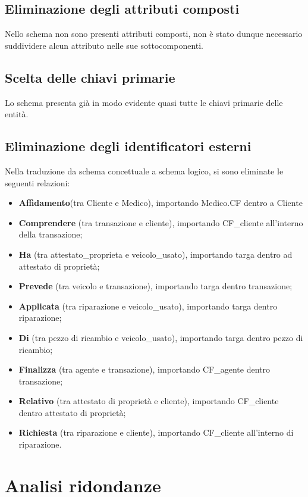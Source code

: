 \documentclass[a4paper,12pt]{report}
\begin{document}
\subsection*{Eliminazione degli attributi composti }
Nello schema non sono presenti attributi composti, non è stato dunque necessario suddividere alcun attributo nelle sue sottocomponenti.
\subsection*{Scelta delle chiavi primarie }
Lo schema presenta già in modo evidente quasi tutte le chiavi primarie delle entità.

\subsection*{Eliminazione degli identificatori esterni }
Nella traduzione da schema concettuale a schema logico, si sono eliminate le seguenti relazioni: 

\begin{itemize}
	\item \textbf{Affidamento}(tra Cliente e Medico), importando Medico.CF dentro a Cliente 
	\item \textbf{Comprendere} (tra transazione e cliente), importando CF\_cliente all’interno della transazione;
	\item \textbf{Ha} (tra attestato\_proprieta e veicolo\_usato), importando targa dentro ad attestato di proprietà;
	\item \textbf{Prevede} (tra veicolo e transazione), importando targa dentro transazione;
	\item \textbf{Applicata} (tra riparazione e veicolo\_usato), importando targa dentro riparazione;
	\item \textbf{Di} (tra pezzo di ricambio e veicolo\_usato), importando targa dentro pezzo di ricambio;
	\item \textbf{Finalizza} (tra agente e transazione), importando CF\_agente dentro transazione;
	\item \textbf{Relativo} (tra attestato di proprietà e cliente), importando CF\_cliente dentro attestato di proprietà;
	\item \textbf{Richiesta} (tra riparazione e cliente), importando CF\_cliente all’interno di riparazione.
\end{itemize}

\section{Analisi ridondanze}
\end{document}
